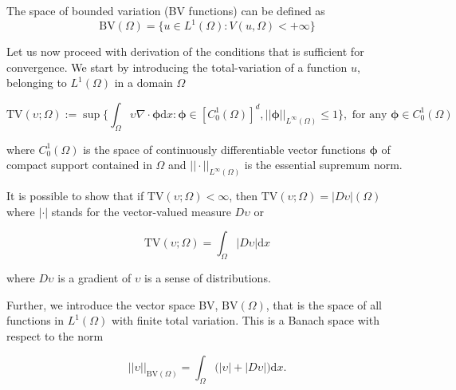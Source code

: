 The space of bounded variation (BV functions) can be defined as 
\begin{equation}
\text{BV}(\Omega) = \{u\in L^1(\Omega): V(u, \Omega) < +\infty\}
\end{equation}




Let us now proceed with derivation of the conditions that is sufficient for convergence. We start by introducing the total-variation of a function $u$, belonging to $L^1(\Omega)$ in a domain $\Omega$

\begin{equation}
\text{TV}(\upsilon;\Omega):=\sup\Bigg\{ \int_{\Omega} \upsilon\nabla\cdot\boldsymbol{\phi}\text{d}x: \boldsymbol{\phi}\in [C_0 ^1 (\Omega)]^d, ||\boldsymbol{\phi}||_{L^{\infty}(\Omega)}\leq 1 \Bigg\}, \text{ for any }\boldsymbol{\phi} \in C_0 ^1 (\Omega)
\end{equation}

where $C_0 ^1(\Omega)$ is the space of continuously differentiable vector functions $\boldsymbol{\phi}$ of compact support contained in $\Omega$ and $||\cdot||_{L^{\infty}(\Omega)}$ is the essential supremum norm. 

It is possible to show that \citep[\eg][]{Luigi:2002} if $\text{TV}(\upsilon ; \Omega) < \infty$, then $\text{TV}(\upsilon ; \Omega) = |D\upsilon|(\Omega)$ where $|\cdot|$ stands for the vector-valued measure $D\upsilon$ or 

\begin{equation}
\text{TV}(\upsilon; \Omega) = \int_{\Omega}|D\upsilon|\text{d}x
\end{equation}

where $D\upsilon$ is a gradient of $\upsilon$ is a sense of distributions. 

Further, we introduce the vector space BV, $\text{BV}(\Omega)$, that is the space of all functions in $L^1(\Omega)$ with finite total variation. 
This is a Banach space with respect to the norm 

\begin{equation}
|| \upsilon ||_{\text{BV}(\Omega)} = \int_{\Omega}\big(|\upsilon| + |D\upsilon|\big)\text{d}x.
\end{equation}

